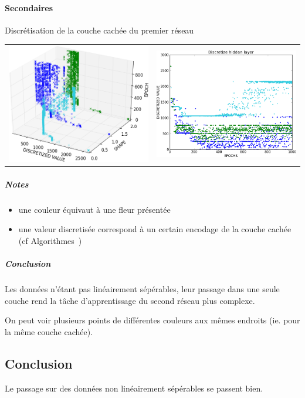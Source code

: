     \paragraph{Secondaires}
      Discrétisation de la couche cachée du premier réseau
      \begin{center}
	\begin{tabular}{lr}
	  \hspace*{-1cm}
	  \includegraphics[width=250px]{data/expA4/discretize_cloud.png}
	  &
	  \includegraphics[width=250px]{data/expA4/discretize.png} 
	\end{tabular}
      \end{center} 
      \subparagraph{Notes}
	\begin{itemize}
	  \item une couleur équivaut à une fleur présentée
	  \item une valeur discretisée correspond à un certain encodage de la couche cachée (cf Algorithmes~)
	\end{itemize}
      \subparagraph{Conclusion}
	Les données n'étant pas linéairement sépérables, leur passage dans une seule couche rend la tâche d'apprentissage
	du second réseau plus complexe.
	
	On peut voir plusieurs points de différentes couleurs aux mêmes endroits (ie. pour la même couche cachée).

  \subsection{Conclusion}
  Le passage sur des données non linéairement sépérables se passent bien.
  
